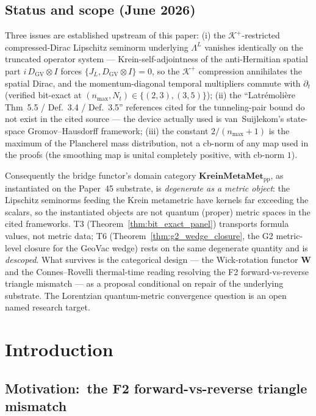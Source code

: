 \documentclass[11pt,a4paper]{article}
\theoremstyle{plain}
\theoremstyle{definition}
\newcommand{\nmax}{n_{\max}}
\newcommand{\Nt}{N_{t}}
\newcommand{\Krein}{\mathcal{K}}
\newcommand{\DGV}{D_{\mathrm{GV}}}
\newcommand{\JL}{J_{L}}
\newcommand{\Kplus}{\Krein^{+}}
\newcommand{\Lprop}{\Lambda^{L}}
\newcommand{\Wfun}{\mathbf{W}}
\newcommand{\KreinMM}{\mathbf{KreinMetaMet}_{\mathrm{pp}}}
\begin{document}
\subsection*{Status and scope (June 2026)}
Three issues are established upstream of this paper: (i) the
$\Kplus$-restricted compressed-Dirac Lipschitz seminorm underlying
$\Lprop$ vanishes identically on the truncated operator system ---
Krein-self-adjointness of the anti-Hermitian spatial part
$i\,\DGV \otimes I$ forces $\{\JL, \DGV \otimes I\} = 0$, so the
$\Kplus$ compression annihilates the spatial Dirac, and the
momentum-diagonal temporal multipliers commute with $\partial_t$
(verified bit-exact at $(\nmax, \Nt) \in \{(2,3), (3,5)\}$); (ii)
the ``Latr\'emoli\`ere Thm~5.5 / Def.~3.4 / Def.~3.5'' references
cited for the tunneling-pair bound do not exist in the cited source
--- the device actually used is van~Suijlekom's state-space
Gromov--Hausdorff framework; (iii) the constant $2/(\nmax + 1)$ is
the maximum of the Plancherel mass distribution, not a cb-norm of
any map used in the proofs (the smoothing map is unital completely
positive, with cb-norm $1$).

Consequently the bridge functor's domain category $\KreinMM$, as
instantiated on the Paper~45 substrate, is \emph{degenerate as a
metric object}: the Lipschitz seminorms feeding the Krein metametric
have kernels far exceeding the scalars, so the instantiated objects
are not quantum (proper) metric spaces in the cited frameworks.
T3 (Theorem~\ref{thm:bit_exact_panel}) transports formula values,
not metric data; T6 (Theorem~\ref{thm:g2_wedge_closure}, the G2
metric-level closure for the GeoVac wedge) rests on the same
degenerate quantity and is \emph{descoped}. What survives is the
categorical design --- the Wick-rotation functor $\Wfun$ and the
Connes--Rovelli thermal-time reading resolving the F2
forward-vs-reverse triangle mismatch --- as a proposal conditional
on repair of the underlying substrate. The Lorentzian quantum-metric
convergence question is an open named research target.

\tableofcontents

\section{Introduction}\label{sec:intro}

\subsection{Motivation:\ the F2 forward-vs-reverse triangle mismatch}
\label{sec:motivation}
\end{document}
